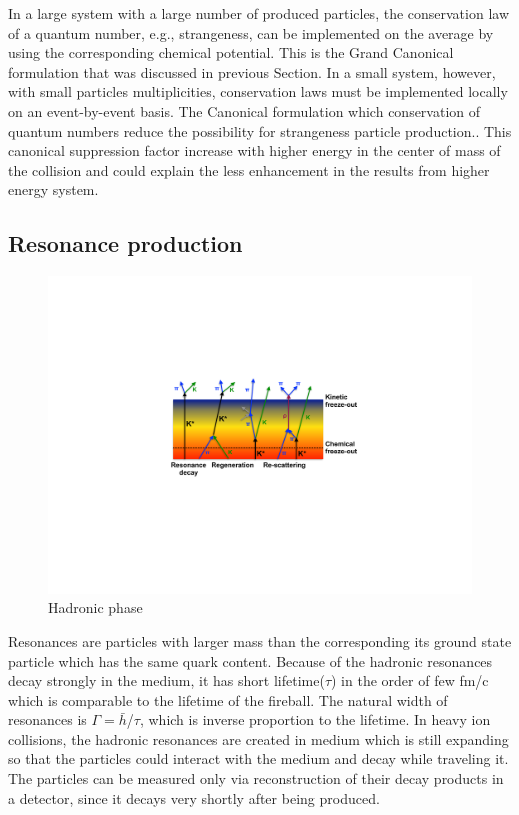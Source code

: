 In a large system with a large number of produced particles, the conservation law of a quantum number, e.g., strangeness, can be implemented on the average by using the corresponding chemical potential. This is the Grand Canonical formulation that was discussed in previous Section. In a small system, however, with small particles multiplicities, conservation laws must be implemented locally on an event-by-event basis. The Canonical formulation which conservation of quantum numbers reduce the possibility for strangeness particle production.\cite{cite:suppression}. This canonical suppression factor increase with higher energy in the center of mass of the collision and could explain the less enhancement in the results from higher energy system.


\subsection{Resonance production}

\begin{figure}[htbp]
\begin{center}
\includegraphics[width=12.cm]{./Version1/FigChapter3/Hadronic}
\caption{Hadronic phase }
\label{fig:hadronic}
\end{center}
\end{figure}



Resonances are particles with larger mass than the corresponding its ground state particle which has the same quark content. Because of the hadronic resonances decay strongly in the medium, it has short lifetime($\tau$) in the order of few fm/c which is comparable to the lifetime of the fireball. The natural width of resonances is $\Gamma = \bar{h}$/$\tau$, which is inverse proportion to the lifetime. 
In heavy ion collisions, the hadronic resonances are created in medium which is still expanding so that the particles could interact with the medium and decay while traveling it. The particles can be measured only via reconstruction of their decay products in a detector, since it decays very shortly after being produced.

